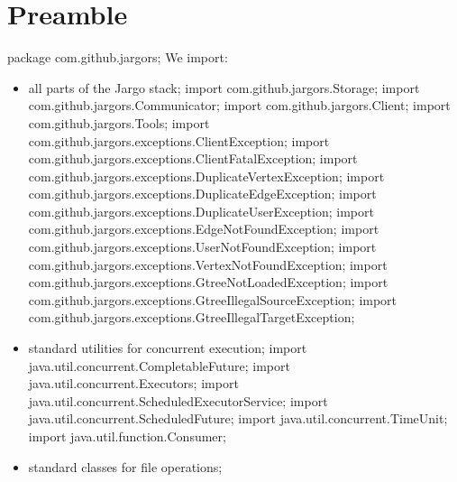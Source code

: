 \section{Preamble}
\nwenddocs{}\endmoddef{}
package com.github.jargors;
\nwendcode{}\nwdocspar
We import:
\begin{itemize}
\item all parts of the Jargo stack;
\nwenddocs{}\plusendmoddef
import com.github.jargors.Storage;
import com.github.jargors.Communicator;
import com.github.jargors.Client;
import com.github.jargors.Tools;
import com.github.jargors.exceptions.ClientException;
import com.github.jargors.exceptions.ClientFatalException;
import com.github.jargors.exceptions.DuplicateVertexException;
import com.github.jargors.exceptions.DuplicateEdgeException;
import com.github.jargors.exceptions.DuplicateUserException;
import com.github.jargors.exceptions.EdgeNotFoundException;
import com.github.jargors.exceptions.UserNotFoundException;
import com.github.jargors.exceptions.VertexNotFoundException;
import com.github.jargors.exceptions.GtreeNotLoadedException;
import com.github.jargors.exceptions.GtreeIllegalSourceException;
import com.github.jargors.exceptions.GtreeIllegalTargetException;
\nwendcode{}\item standard utilities for concurrent execution;
\nwenddocs{}\plusendmoddef
import java.util.concurrent.CompletableFuture;
import java.util.concurrent.Executors;
import java.util.concurrent.ScheduledExecutorService;
import java.util.concurrent.ScheduledFuture;
import java.util.concurrent.TimeUnit;
import java.util.function.Consumer;
\nwendcode{}\item standard classes for file operations;

\end{itemize}
